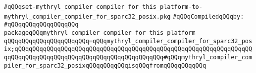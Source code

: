 \label{src/lib/core/mythryl-compiler-compiler/set-mythryl_compiler_compiler_for_this_platform-to-mythryl_compiler_compiler_for_sparc32_posix.pkg}
\verb|#qQQqset-mythryl_compiler_compiler_for_this_platform-to-mythryl_compiler_compiler_for_sparc32_posix.pkg|\newline
\newline
\verb|#qQQqCompiledqQQqby:|\newline
\verb|#qQQqqQQqqQQqqQQqqQQq|\newline
\newline
\verb|packageqQQqmythryl_compiler_compiler_for_this_platform|\newline
\verb|qQQqqQQqqQQqqQQqqQQqqQQq=qQQqmythryl_compiler_compiler_for_sparc32_posix;qQQqqQQqqQQqqQQqqQQqqQQqqQQqqQQqqQQqqQQqqQQqqQQqqQQqqQQqqQQqqQQqqQQqqQQqqQQqqQQqqQQqqQQqqQQqqQQqqQQqqQQqqQQqqQQq#qQQqmythryl_compiler_compiler_for_sparc32_posixqQQqqQQqqQQqisqQQqfromqQQqqQQqqQQq|\newline

